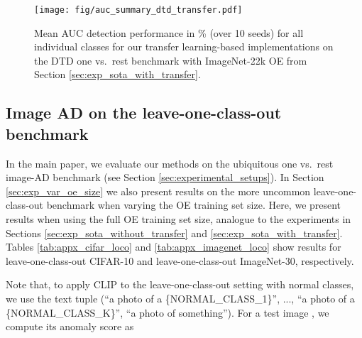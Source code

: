 \documentclass[10pt]{article} \usepackage[accepted]{stylefiles/tmlr}
\begin{document}
\begin{figure}[hbt] 
  \begin{center} 
      \texttt{[image: fig/auc\_summary\_dtd\_transfer.pdf]}
      \caption{Mean AUC detection performance in \% (over 10 seeds) for all individual classes for our transfer learning-based implementations on the DTD one vs.~rest benchmark with ImageNet-22k OE from Section \ref{sec:exp_sota_with_transfer}.}
      \label{fig:auc_summary_dtd_transfer}
  \end{center}
\end{figure}



 
\clearpage
\subsection{Image AD on the leave-one-class-out benchmark} 
\label{appx:section_loco_results}
In the main paper, we evaluate our methods on the ubiquitous one vs.~rest image-AD benchmark (see Section \ref{sec:experimental_setups}).
In Section \ref{sec:exp_var_oe_size} we also present results on the more uncommon leave-one-class-out benchmark when varying the OE training set size.
Here, we present results when using the full OE training set size, analogue to the experiments in Sections \ref{sec:exp_sota_without_transfer} and \ref{sec:exp_sota_with_transfer}.
Tables \ref{tab:appx_cifar_loco} and \ref{tab:appx_imagenet_loco} show results for leave-one-class-out CIFAR-10 and leave-one-class-out ImageNet-30, respectively. 


Note that, to apply CLIP to the leave-one-class-out setting with  normal classes, we use the text tuple  (``a photo of a \{NORMAL\_CLASS\_1\}'', ..., ``a photo of a \{NORMAL\_CLASS\_{K}\}'', ``a photo of something'').
For a test image , we compute its anomaly score as
\end{document}
